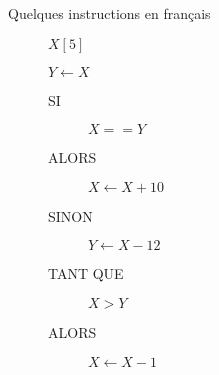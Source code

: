 \begin{frame}{Quelques instructions en français}
    
    \begin{description}
        \item [] $X[5]\;\;\;\;\;$ 
        \item []
        \item [] $Y \leftarrow X\;$  
        \item []
        \item [] 
        \begin{description}
            \item [SI] $X == Y$
            \item [ALORS] $X \leftarrow X + 10$
            \item [SINON] $Y \leftarrow X - 12$
        \end{description}
        \item []
        \item [] 
        \begin{description}
            \item [TANT QUE] $X > Y$
            \item [ALORS] $X \leftarrow X - 1$
        \end{description}
    \end{description}

    
\end{frame}
